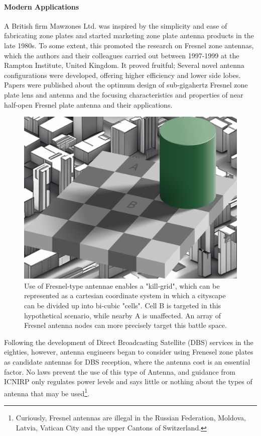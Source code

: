 \documentclass[review]{elsarticle}
\begin{document}
\paragraph{Modern Applications} A British firm Mawzones Ltd. was inspired by the simplicity and ease of fabricating zone plates and started marketing zone plate antenna products in the late 1980s. To some extent, this promoted the research on Fresnel zone antennas, which the authors and their colleagues carried out between 1997-1999 at the Rampton Institute, United Kingdom. It proved fruitful; Several novel antenna configurations were developed, offering higher efficiency and lower side lobes. Papers were published about the optimum design of sub-gigahertz\cite{Trower1991} Fresnel zone plate lens and antenna and the focusing characteristics\cite{LotharPreen2001} and properties of near half-open Fresnel plate antenna and their applications.

\begin{figure}
    \centering
    \includegraphics[width=0.5\linewidth]{shadow_of_destructions.jpg}
    \caption{Use of Fresnel-type antennae enables a "kill-grid", which can be represented as a cartesian coordinate system in which a cityscape can be divided up into bi-cubic "cells". Cell B is targeted in this hypothetical scenario, while nearby A is unaffected. An array of Fresnel antenna nodes can more precisely target this battle space.}
    \label{fig:enter-label}
\end{figure}

Following the development of Direct Broadcasting Satellite (DBS) services in the eighties, however, antenna engineers began to consider using Frenesel zone plates as candidate antennas for DBS reception, where the antenna  cost is an essential factor. No laws prevent the use of this type of Antenna, and guidance from ICNIRP only regulates power levels and says little or nothing about the types of antenna that may be used\footnote{Curiously, Fresnel antennas are illegal in the Russian Federation, Moldova, Latvia, Vatican City and the upper Cantons of Switzerland.}. 
\end{document}
